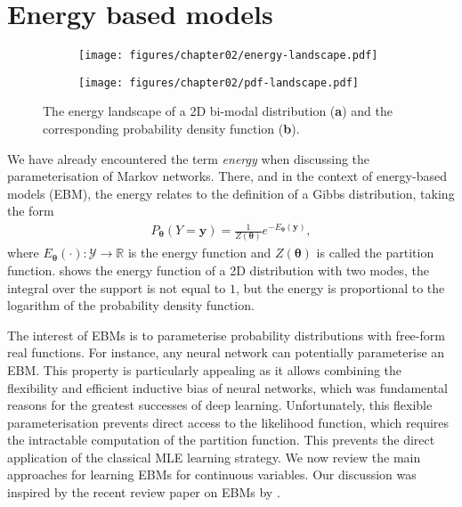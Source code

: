 \section{Energy based models}
\begin{figure*}
  \centering
  \begin{subfigure}{.48\textwidth}
    \centering
    \texttt{[image: figures/chapter02/energy-landscape.pdf]}
    \caption{}
    \label{fig:Energy}
  \end{subfigure}
  \begin{subfigure}{.48\textwidth}
    \centering
    \texttt{[image: figures/chapter02/pdf-landscape.pdf]}
    \caption{}
    \label{fig:pdf}
  \end{subfigure}
  \caption{The energy landscape of a 2D bi-modal distribution (\textbf{a}) and the corresponding probability density function (\textbf{b}).}
\end{figure*}
We have already encountered the term \textit{energy} when discussing the parameterisation of Markov networks. There, and in the context of energy-based models (EBM), the energy relates to the definition of a Gibbs distribution, taking the form
\begin{align}
  P_{\bm{\theta}}(Y=\bm{y}) = \frac{1}{Z(\bm{\theta})} e^{-E_{\bm{\theta}}(\bm{y})},
\end{align}
where $E_{\bm{\theta}}(\cdot): \mathcal{Y}\rightarrow \mathbb{R}$ is the energy function and $Z(\bm{\theta})$ is called the partition function.  shows the energy function of a 2D distribution with two modes, the integral over the support is not equal to $1$, but the energy is proportional to the logarithm of the probability density function.

The interest of EBMs is to parameterise probability distributions with free-form real functions. For instance, any neural network can potentially parameterise an EBM. This property is particularly appealing as it allows combining the flexibility and efficient inductive bias of neural networks, which was fundamental reasons for the greatest successes of deep learning. Unfortunately, this flexible parameterisation prevents direct access to the likelihood function, which requires the intractable computation of the partition function. This prevents the direct application of the classical MLE learning strategy. We now review the main approaches for learning EBMs for continuous variables. Our discussion was inspired by the recent review paper on EBMs by \citet{song2021train}.

